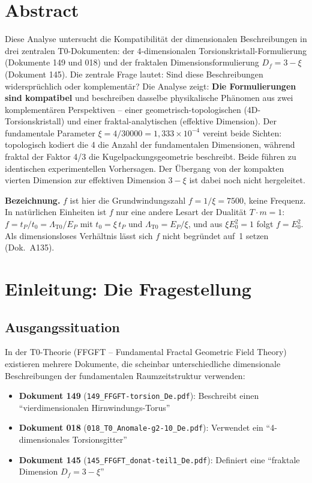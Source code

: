 \section*{Abstract}
		Diese Analyse untersucht die Kompatibilität der dimensionalen Beschreibungen in drei zentralen T0-Dokumenten: der 4-dimensionalen Torsionskristall-Formulierung (Dokumente 149 und 018) und der fraktalen Dimensionsformulierung $D_f = 3 - \xi$ (Dokument 145). Die zentrale Frage lautet: Sind diese Beschreibungen widersprüchlich oder komplementär? Die Analyse zeigt: \textbf{Die Formulierungen sind kompatibel} und beschreiben dasselbe physikalische Phänomen aus zwei komplementären Perspektiven -- einer geometrisch-topologischen (4D-Torsionskristall) und einer fraktal-analytischen (effektive Dimension). Der fundamentale Parameter $\xi = 4/30000 = 1{,}333 \times 10^{-4}$ vereint beide Sichten: topologisch kodiert die 4 die Anzahl der fundamentalen Dimensionen, während fraktal der Faktor 4/3 die Kugelpackungsgeometrie beschreibt. Beide führen zu identischen experimentellen Vorhersagen. Der Übergang von der kompakten vierten Dimension zur effektiven Dimension $3-\xi$ ist dabei noch nicht hergeleitet.

	\medskip\noindent\textbf{Bezeichnung.} $f$ ist hier die Grundwindungszahl $f = 1/\xi = 7500$, keine Frequenz. In natürlichen Einheiten ist $f$ nur eine andere Lesart der Dualität $T\cdot m = 1$: $f = t_P/t_0 = \Lambda_{\text{T0}}/E_P$ mit $t_0 = \xi\,t_P$ und $\Lambda_{\text{T0}} = E_P/\xi$, und aus $\xi E_0^2 = 1$ folgt $f = E_0^2$. Als dimensionsloses Verhältnis lässt sich $f$ nicht begründet auf~1 setzen (Dok.~A135).

	
	
	\section{Einleitung: Die Fragestellung}
	
	\subsection{Ausgangssituation}
	
	In der T0-Theorie (FFGFT -- Fundamental Fractal Geometric Field Theory) existieren mehrere Dokumente, die scheinbar unterschiedliche dimensionale Beschreibungen der fundamentalen Raumzeitstruktur verwenden:
	
	\begin{itemize}
		\item \textbf{Dokument 149} (\texttt{149\_FFGFT-torsion\_De.pdf}): Beschreibt einen \enquote{vierdimensionalen Hirnwindungs-Torus}
		\item \textbf{Dokument 018} (\texttt{018\_T0\_Anomale-g2-10\_De.pdf}): Verwendet ein \enquote{4-dimensionales Torsionsgitter}
		\item \textbf{Dokument 145} (\texttt{145\_FFGFT\_donat-teil1\_De.pdf}): Definiert eine \enquote{fraktale Dimension $D_f = 3 - \xi$}
	\end{itemize}
	
